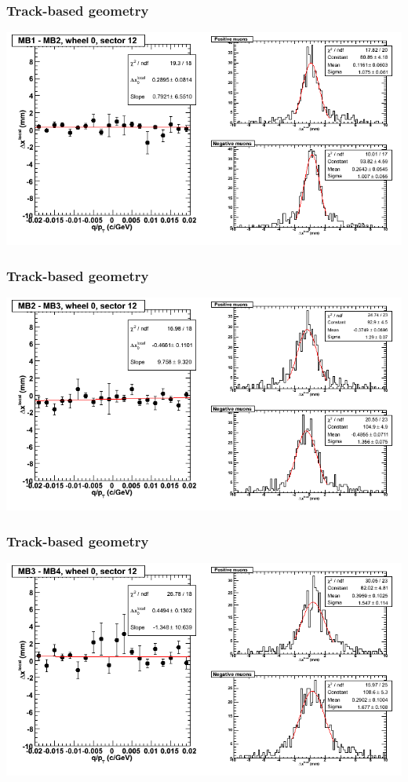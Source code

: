 \documentclass[compress]{beamer}
\begin{document}
\begin{frame}
\frametitle{Track-based geometry}
\includegraphics[width=\linewidth]{NOV4_segdiffs/dt13_resid_C_12_12.png}
\end{frame}

\begin{frame}
\frametitle{Track-based geometry}
\includegraphics[width=\linewidth]{NOV4_segdiffs/dt13_resid_C_12_23.png}
\end{frame}

\begin{frame}
\frametitle{Track-based geometry}
\includegraphics[width=\linewidth]{NOV4_segdiffs/dt13_resid_C_12_34.png}
\end{frame}
\end{document}
